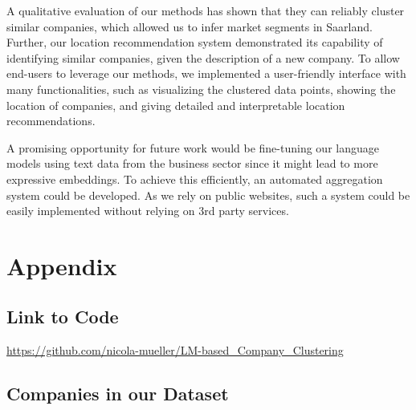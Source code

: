 \documentclass[12pt]{article}
\begin{document}
   A qualitative evaluation of our methods has shown that they can reliably cluster similar companies, which allowed us to infer market segments in Saarland. Further, our location recommendation system demonstrated its capability of identifying similar companies, given the description of a new company. To allow end-users to leverage our methods, we implemented a user-friendly interface with many functionalities, such as visualizing the clustered data points, showing the location of companies, and giving detailed and interpretable location recommendations.
   
   A promising opportunity for future work would be fine-tuning our language models using text data from the business sector since it might lead to more expressive embeddings. To achieve this efficiently, an automated aggregation system could be developed. As we rely on public websites, such a system could be easily implemented without relying on 3rd party services.

    
    
	
	
	\newpage
	\section{Appendix}
	
	\subsection{Link to Code}
	\url{https://github.com/nicola-mueller/LM-based_Company_Clustering}
	
	\subsection{Companies in our Dataset}
	\label{sec:appendix-companies}
	
\end{document}
